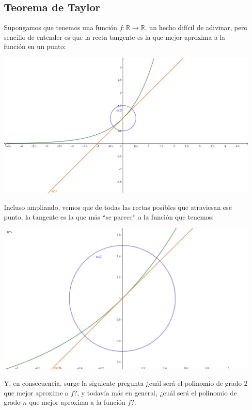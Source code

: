 \documentclass[10pt,a4paper,openright]{book}
\theoremstyle{break}
\begin{document}
\subsection{Teorema de Taylor}
Supongamos que tenemos una función $f:\mathbb R\rightarrow \mathbb R$, un hecho difícil de adivinar, pero sencillo de entender es que la recta tangente es la que mejor aproxima a la función en un punto:
\begin{center}
\includegraphics[scale=0.9]{polinomio de taylor 1}
\end{center}
Incluso ampliando, vemos que de todas las rectas posibles que atraviesan ese punto, la tangente es la que más ``se parece'' a la función que tenemos:
\begin{center}
\includegraphics[scale=0.25]{de taylor 2}
\end{center}
Y, en consecuencia, surge la siguiente pregunta ¿cuál será el polinomio de grado 2 que mejor aproxime a $f$?, y todavía más en general, ¿cuál será el polinomio de grado $n$ que mejor aproxima a la función $f$?.
\end{document}
